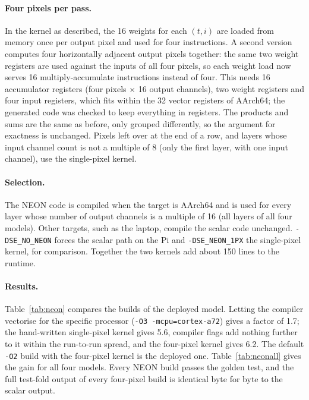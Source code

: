 \documentclass[11pt,a4paper]{article}
\begin{document}
\paragraph{Four pixels per pass.} In the kernel as described, the 16 weights
for each $(t, i)$ are loaded from memory once per output pixel and used for
four instructions. A second version computes four horizontally adjacent
output pixels together: the same two weight registers are used against the
inputs of all four pixels, so each weight load now serves 16
multiply-accumulate instructions instead of four. This needs 16 accumulator
registers (four pixels $\times$ 16 output channels), two weight registers and
four input registers, which fits within the 32 vector registers of AArch64;
the generated code was checked to keep everything in registers. The products
and sums are the same as before, only grouped differently, so the argument
for exactness is unchanged. Pixels left over at the end of a row, and layers
whose input channel count is not a multiple of 8 (only the first layer, with
one input channel), use the single-pixel kernel.

\paragraph{Selection.} The NEON code is compiled when the target is AArch64
and is used for every layer whose number of output channels is a multiple of
16 (all layers of all four models). Other targets, such as the laptop,
compile the scalar code unchanged. \texttt{-DSE\_NO\_NEON} forces the scalar
path on the Pi and \texttt{-DSE\_NEON\_1PX} the single-pixel kernel, for
comparison. Together the two kernels add about 150 lines to the runtime.

\paragraph{Results.} Table~\ref{tab:neon} compares the builds of the
deployed model. Letting the compiler vectorise for the specific processor
(\texttt{-O3 -mcpu=cortex-a72}) gives a factor of 1.7; the hand-written
single-pixel kernel gives 5.6, compiler flags add nothing further to it
within the run-to-run spread, and the four-pixel kernel gives 6.2. The
default \texttt{-O2} build with the four-pixel kernel is the deployed one.
Table~\ref{tab:neonall} gives the gain for all four models. Every NEON
build passes the golden test, and the full test-fold output of every
four-pixel build is identical byte for byte to the scalar output.
\end{document}
